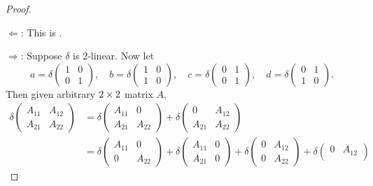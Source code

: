 \begin{proof} \ 

\(\Longleftarrow\): This is .

\(\Longrightarrow\): Suppose \(\delta\) is \(2\)-linear.
Now let
\[
    a = \delta \begin{pmatrix}
        1 & 0 \\
        0 & 1
    \end{pmatrix}, \quad
    b = \delta \begin{pmatrix}
        1 & 0 \\
        1 & 0
    \end{pmatrix}, \quad
    c = \delta \begin{pmatrix}
        0 & 1 \\
        0 & 1
    \end{pmatrix}, \quad
    d = \delta \begin{pmatrix}
        0 & 1 \\
        1 & 0
    \end{pmatrix}.
\]
Then given arbitrary \(2 \times 2\) matrix \(A\),
\begin{align*}
    \delta \begin{pmatrix}
        A_{11} & A_{12} \\
        A_{21} & A_{22}
    \end{pmatrix}
    & = \delta \begin{pmatrix}
        A_{11} & 0 \\
        A_{21} & A_{22}
    \end{pmatrix}
    + \delta \begin{pmatrix}
        0 & A_{12} \\
        A_{21} & A_{22}
    \end{pmatrix} \\
    & = \delta \begin{pmatrix}
        A_{11} & 0 \\
        0 & A_{22}
    \end{pmatrix}
    + \delta \begin{pmatrix}
        A_{11} & 0 \\
        A_{21} & 0
    \end{pmatrix}
    + \delta \begin{pmatrix}
        0 & A_{12} \\
        0 & A_{22}
    \end{pmatrix}
    + \delta \begin{pmatrix}
        0 & A_{12} \\

\end{pmatrix}
\end{align*}
\end{proof}
